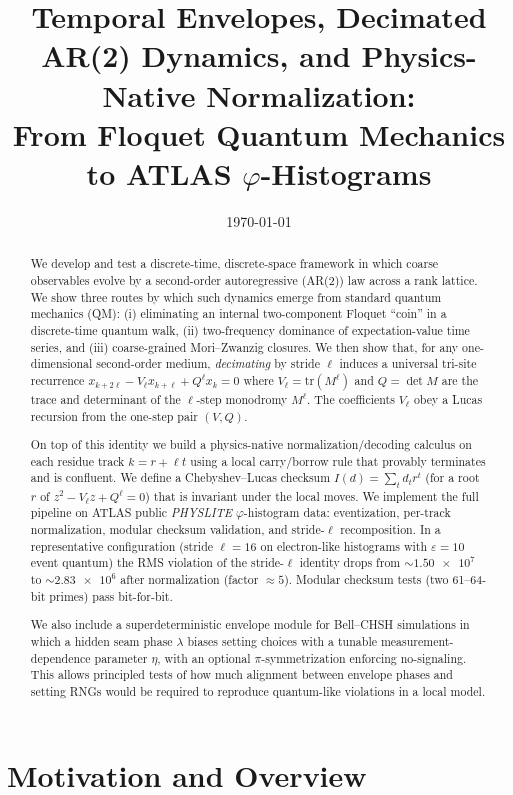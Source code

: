 \documentclass[11pt]{article}
\title{\vspace{-2ex}\Large Temporal Envelopes, Decimated AR(2) Dynamics, and Physics-Native Normalization:\\
From Floquet Quantum Mechanics to ATLAS \texorpdfstring{$\varphi$}{phi}-Histograms}
\author{}
\date{\today}
\begin{document}
\maketitle

\begin{abstract}
We develop and test a discrete-time, discrete-space framework in which coarse observables evolve by
a second-order autoregressive (AR(2)) law across a rank lattice. We show three routes by which such
dynamics emerge from standard quantum mechanics (QM): (i) eliminating an internal two-component
Floquet ``coin'' in a discrete-time quantum walk, (ii) two-frequency dominance of expectation-value
time series, and (iii) coarse-grained Mori--Zwanzig closures. We then show that, for any one-dimensional
second-order medium, \emph{decimating} by stride $\ell$ induces a universal tri-site recurrence
$x_{k+2\ell} - V_\ell x_{k+\ell} + Q^\ell x_k = 0$ where $V_\ell=\mathrm{tr}(M^\ell)$ and $Q=\det M$
are the trace and determinant of the $\ell$-step monodromy $M^\ell$. The coefficients $V_\ell$ obey a
Lucas recursion from the one-step pair $(V,Q)$.

On top of this identity we build a physics-native normalization/decoding calculus on each residue
track $k=r+\ell t$ using a local carry/borrow rule that provably terminates and is confluent. We
define a Chebyshev--Lucas checksum $I(d)=\sum_t d_t r^t$ (for a root $r$ of $z^2-V_\ell z + Q^\ell=0$)
that is invariant under the local moves. We implement the full pipeline on ATLAS public \emph{PHYSLITE}
$\varphi$-histogram data: eventization, per-track normalization, modular checksum validation, and
stride-$\ell$ recomposition. In a representative configuration (stride $\ell=16$ on electron-like
histograms with $\varepsilon=10$ event quantum) the RMS violation of the stride-$\ell$ identity
drops from $\sim\!\num{1.50e7}$ to $\sim\!\num{2.83e6}$ after normalization (factor $\approx5$).
Modular checksum tests (two 61--64-bit primes) pass bit-for-bit.

We also include a superdeterministic envelope module for Bell--CHSH simulations in which a hidden
seam phase $\lambda$ biases setting choices with a tunable measurement-dependence parameter $\eta$,
with an optional $\pi$-symmetrization enforcing no-signaling. This allows principled tests of how
much alignment between envelope phases and setting RNGs would be required to reproduce quantum-like
violations in a local model.
\end{abstract}

\section{Motivation and Overview}
\end{document}
